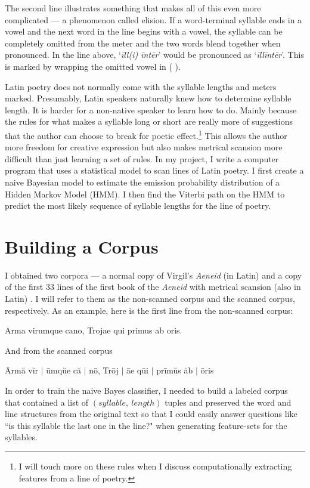 \documentclass[12pt]{article}
\begin{document}
The second line illustrates something that makes all of this even more complicated --- a phenomenon called elision.  If a word-terminal syllable ends in a vowel and the next word in the line begins with a vowel, the syllable can be completely omitted from the meter and the two words blend together when pronounced. In the line above, `\emph{\={i}ll(i) \={i}nt\={e}r}' would be pronounced as `\emph{\={i}ll\={i}nt\={e}r}'. This is marked by wrapping the omitted vowel in ( ).   

Latin poetry does not normally come with the syllable lengths and meters marked. Presumably, Latin speakers naturally knew how to determine syllable length. It is harder for a non-native speaker to learn how to do. Mainly because the rules for what makes a syllable long or short are really more of suggestions that the author can choose to break for poetic effect.\footnote{I will touch more on these rules when I discuss computationally extracting features from a line of poetry.} This allows the author more freedom for creative expression but also makes metrical scansion more difficult than just learning a set of rules. In my project, I write a computer program that uses a statistical model to scan lines of Latin poetry. I first create a naive Bayesian model to estimate the emission probability distribution of a Hidden Markov Model (HMM). I then find the Viterbi path on the HMM to predict the most likely sequence of syllable lengths for the line of poetry. 

\section*{Building a Corpus}
I obtained two corpora --- a normal copy of Virgil's \emph{Aeneid} (in Latin) \cite{Virgil} and a copy of the first 33 lines of the first book of the \emph{Aeneid} with metrical scansion (also in Latin) \cite{Rodde}. I will refer to them as the non-scanned corpus and the scanned corpus, respectively. As an example, here is the first line from the non-scanned corpus:
\begin{center}
Arma virumque cano, Trojae qui primus ab oris.
\end{center}
And from the scanned corpus
\begin{center}
\={A}rm\u{a} v\u{i}r  $\vert$ \={u}mq\u{ue} c\u{a}  $\vert$  n\={o}, Tr\={oj} $\vert$ \={ae} q\={ui} $\vert$ pr\={i}m\u{u}s \u{a}b $\vert$ \={o}ris 
\end{center}

In order to train the naive Bayes classifier, I needed to build a labeled corpus that contained a list of $(syllable,\ length)$ tuples and preserved the word and line structures from the original text so that I could easily answer questions like ``is this syllable the last one in the line?" when generating feature-sets for the syllables.
\end{document}
